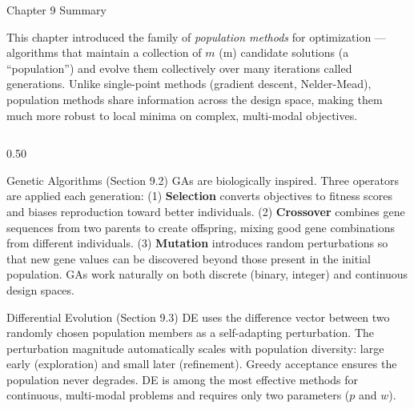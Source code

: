 \documentclass[aspectratio=169,10pt]{beamer}
\begin{document}
\begin{frame}[allowframebreaks]{Chapter 9 Summary}

  This chapter introduced the family of \emph{population methods}
  for optimization --- algorithms that maintain a collection of
  $m$ (m) candidate solutions (a ``population'') and evolve them
  collectively over many iterations called generations.  Unlike
  single-point methods (gradient descent, Nelder-Mead), population
  methods share information across the design space, making them
  much more robust to local minima on complex, multi-modal objectives.

  \begin{columns}[T]
    \begin{column}{0.50\textwidth}
      \begin{block}{Genetic Algorithms (Section 9.2)}
        GAs are biologically inspired.  Three operators are applied
        each generation: (1) \textbf{Selection} converts objectives
        to fitness scores and biases reproduction toward better
        individuals.  (2) \textbf{Crossover} combines gene sequences
        from two parents to create offspring, mixing good gene
        combinations from different individuals.  (3) \textbf{Mutation}
        introduces random perturbations so that new gene values can
        be discovered beyond those present in the initial population.
        GAs work naturally on both discrete (binary, integer) and
        continuous design spaces.
      \end{block}

      \begin{block}{Differential Evolution (Section 9.3)}
        DE uses the difference vector between two randomly chosen
        population members as a self-adapting perturbation.  The
        perturbation magnitude automatically scales with population
        diversity: large early (exploration) and small later
        (refinement).  Greedy acceptance ensures the population never
        degrades.  DE is among the most effective methods for
        continuous, multi-modal problems and requires only two
        parameters ($p$ and $w$).
      \end{block}


\end{column}
\end{columns}
\end{frame}
\end{document}
